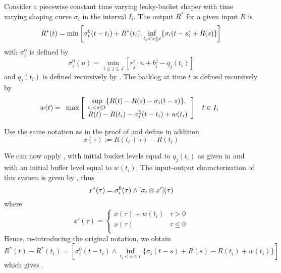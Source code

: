 %
\begin{theorem}  Consider a piecewise constant time
varying leaky-bucket shaper with time varying shaping curve
$\sigma_i$ in the interval $I_i$. The output $R^*$ for a given
input $R$ is
\begin{equation}
\mylabel{l23b-resultDS} R^*(t)=\min \left[ \sigma^0_i(t-t_i)+
R^*(t_i), \displaystyle\inf_{t_i <s \leq t} \{ \sigma_i(t-s)
+R(s)\}\right]
\end{equation}
with $\sigma^0_i$ is defined by
\[
\sigma^0_i(u)=\displaystyle \min_{1 \leq j \leq J} \left[ r_j^i
\cdot u +
                b_i^j - q_j(t_i) \right]
\]
and $q_j(t_i)$ is defined recursively by . The
backlog at time $t$ is defined recursively by
\begin{equation}
\mylabel{l23b-shbuf} w(t)=\begin{array}{lr}
      \max \left [ \begin{array}{l}
        \displaystyle\sup_{t_i < s \leq t}\{R(t)-R(s)-\sigma_i(t-s)\},\\
                     R(t)-R(t_i)-\sigma^0_i(t-t_i) +w(t_i)\\
                        \end{array}
                        \right] &
                t \in I_i\\
\end{array}
\end{equation}
\end{theorem}
\pr
Use the same notation as in the proof of  and
define in addition
$$x(\tau):=R(t_i + \tau) - R(t_i)$$

We can now apply , with initial bucket levels
equal to $q_j(t_i)$ as given in  and with an initial
buffer level equal to $w(t_i)$. The input-output characterization
of this system is given by , thus
\[
x^*(\tau) = \sigma^0_i(\tau) \wedge [\sigma_i \otimes x'](\tau)
\]
where
\[
x'(\tau)=\left \{ \begin{array}{lr} x(\tau)+w(t_i) & \tau > 0 \\
x(\tau) & \tau \leq 0\\
\end{array}
\right .
\]
Hence, re-introducing the original notation, we obtain
\[
R^*(t) - R^*(t_i)=\left[ \sigma^0_i(t-t_i)\wedge
\displaystyle\inf_{t_i <s \leq t} \{ \sigma_i(t-s) +R(s)
-R(t_i)+w(t_i)\}\right]
\]
which gives .

